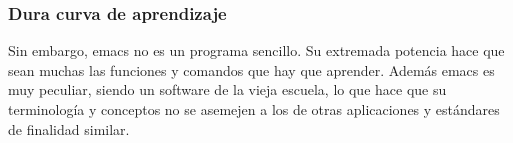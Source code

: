 \documentclass[a4paper, 11pt, titlepage]{book}
\begin{document}
            \subsubsection{Dura curva de aprendizaje} Sin embargo, emacs no es un programa sencillo.
            Su extremada potencia hace que sean muchas las funciones y comandos que hay que aprender.
            Además emacs es muy peculiar, siendo un software de la vieja escuela, lo que hace que 
            su terminología y conceptos no se asemejen a los de otras aplicaciones y estándares de 
            finalidad similar.
\end{document}
